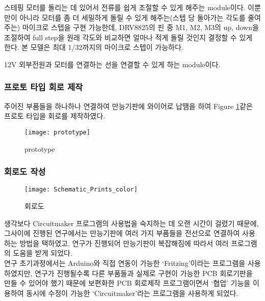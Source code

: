 \begin{description}[font=$\bullet$~\normalfont\scshape\color{red!50!black}]
	\item [TMC2100 (DRV8825)] 스테핑 모터를 돌리는 데 있어서 전류를 쉽게 조절할 수 있게 해주는 module이다. 이뿐만이 아니라 모터를 좀 더 세밀하게 돌릴 수 있게 해주는(스텝 당 돌아가는 각도를 줄여주는) 마이크로 스텝을 구현 가능한데, DRV8825의 핀 중 M1, M2, M3의 up, down을 조절하여 full step을 원래 각도와 비교하면 얼마나 적게 돌릴 것인지 결정할 수 있게 한다. 본 모델은 최대 1/32까지의 마이크로 스텝이 가능하다.
	\item [TE Connectivity/AMP 5525258-3 및 Wurth Elektronik 694106301002] 12V 외부전원과 모터를 연결하는 선을 연결할 수 있게 하는 module이다.
\end{description}

\subsubsection{프로토 타입 회로 제작}

주어진 부품들을 하나하나 연결하여 만능기판에 와이어로 납땜을 하여 Figure \ref{fig:prototype}\과 같은 프로토 타입을 회로를 제작하였다. 

\begin{figure}[h]
	\begin{center}
		\texttt{[image: prototype]} 
		\caption{prototype}
		\label{fig:prototype}
	\end{center}
\end{figure}


\subsubsection{회로도 작성}



\begin{figure}
	\texttt{[image: Schematic\_Prints\_color]}
	\caption{회로도}
	\label{fig:Schematic_Prints}
\end{figure}

생각보다 Circuitmaker 프로그램의 사용법을 숙지하는 데 오랜 시간이 걸렸기 때문에, 그사이에 진행된 연구에서는 만능기판에 여러 가지 부품들을 전선으로 연결하여 사용하는 방법을 택하였고, 연구가 진행되어 만능기판이 복잡해짐에 따라서 여러 프로그램의 도움을 받게 되었다.\\

연구 초기과정에서는 Arduino와 직접 연동이 가능한 ‘Fritzing’이라는 프로그램을 사용하였지만, 연구가 진행될수록 다른 부품들과 실제로 구현이 가능한 PCB 회로기판을 만들 수 있어야 했기 때문에 보편화한 PCB 회로제작 프로그램이면서 ‘협업’ 기능을 이용하여 동시에 수정이 가능한 ‘Circuitmaker’라는 프로그램을 사용하게 되었다.

